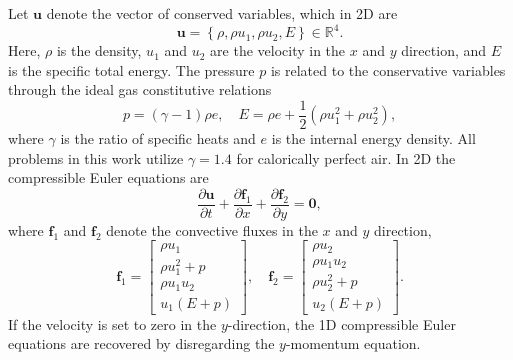 \documentclass{elsarticle}
\theoremstyle{definition}
\theoremstyle{plain}
\theoremstyle{plain}
\newcommand{\pd}[2]{\frac{\partial#1}{\partial#2}}
\newcommand{\reftwo}[1]{{\color{blue}#1}}
\renewcommand{\reftwo}[1]{#1}
\begin{document}
Let $\bm{u}$ denote the vector of conserved variables, which in 2D are
\begin{equation*}
    \bm{u} = \left\{\rho,\rho u_1, \rho u_2, E \right\} \in \mathbb{R}^4.
\end{equation*}
Here, $\rho$ is the density, $u_1$ and $u_2$ are the velocity in the $x$ and $y$ direction, and $E$ is the specific total energy. The pressure $p$ is related to the conservative variables through the ideal gas constitutive relations
\begin{equation*}
    p = (\gamma-1)\rho e, \quad E = \reftwo{\rho} e + \frac{1}{2}(\reftwo{\rho} u_1^2 + \reftwo{\rho} u_2^2),
\end{equation*}
where $\gamma$ is the ratio of specific heats and $e$ is the internal energy density. All problems in this work utilize $\gamma = 1.4$ for calorically perfect air. In 2D the compressible Euler equations are 
\begin{equation*}
    \pd{\bm{u}}{t} + \pd{\bm{f}_1}{x} + \pd{\bm{f}_2}{y} = \bm{0},
\end{equation*}
where $\bm{f}_1$ and $\bm{f}_2$ denote the convective fluxes in the $x$ and $y$ direction,
\begin{equation*}
    \bm{f}_1 = 
    \begin{bmatrix}
        \rho u_1\\
        \rho u_1^2 + p\\
        \rho u_1 u_2 \\
        u_1(E+p)
    \end{bmatrix}, \quad 
    \bm{f}_2 = 
        \begin{bmatrix}
        \rho u_2\\
        \rho u_1 u_2\\
        \rho u_2^2 + p \\
        u_2(E+p)
    \end{bmatrix}.
\end{equation*}
If the velocity is set to zero in the $y$-direction, the 1D compressible Euler equations are recovered by disregarding the $y$-momentum equation.
\end{document}
